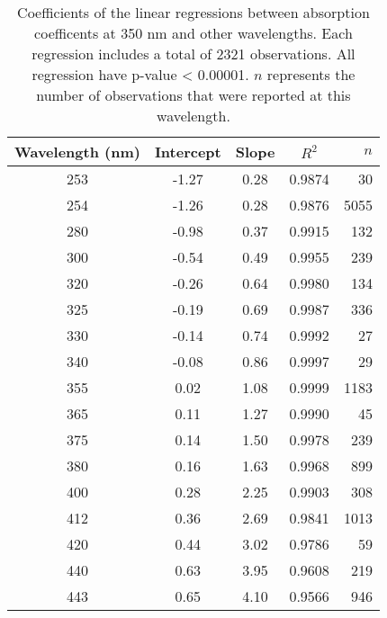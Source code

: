 \begin{table}[ht]
\centering
\begin{tabular}{ccccr}
  \hline
Wavelength (nm) & Intercept & Slope & $R^2$ & $n$ \\ 
  \hline
253 & -1.27 & 0.28 & 0.9874 & 30 \\ 
  254 & -1.26 & 0.28 & 0.9876 & 5055 \\ 
  280 & -0.98 & 0.37 & 0.9915 & 132 \\ 
  300 & -0.54 & 0.49 & 0.9955 & 239 \\ 
  320 & -0.26 & 0.64 & 0.9980 & 134 \\ 
  325 & -0.19 & 0.69 & 0.9987 & 336 \\ 
  330 & -0.14 & 0.74 & 0.9992 & 27 \\ 
  340 & -0.08 & 0.86 & 0.9997 & 29 \\ 
  355 & 0.02 & 1.08 & 0.9999 & 1183 \\ 
  365 & 0.11 & 1.27 & 0.9990 & 45 \\ 
  375 & 0.14 & 1.50 & 0.9978 & 239 \\ 
  380 & 0.16 & 1.63 & 0.9968 & 899 \\ 
  400 & 0.28 & 2.25 & 0.9903 & 308 \\ 
  412 & 0.36 & 2.69 & 0.9841 & 1013 \\ 
  420 & 0.44 & 3.02 & 0.9786 & 59 \\ 
  440 & 0.63 & 3.95 & 0.9608 & 219 \\ 
  443 & 0.65 & 4.10 & 0.9566 & 946 \\ 
   \hline
\end{tabular}
\caption{Coefficients of the linear regressions between absorption 
coefficents at 350 nm and other wavelengths. Each regression includes a total 
of 2321 observations. All regression have p-value < 0.00001.  $n$ represents 
the number of observations that were reported at this wavelength.} 
\end{table}
